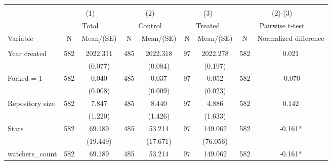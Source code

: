 
\begin{tabular}{@{\extracolsep{5pt}}lcccccccc}
\\[-1.8ex]\hline \hline \\[-1.8ex]
 & \multicolumn{2}{c}{(1)}  & \multicolumn{2}{c}{(2)}  & \multicolumn{2}{c}{(3)}  & \multicolumn{2}{c}{(2)-(3)} \\
 & \multicolumn{2}{c}{Total}  & \multicolumn{2}{c}{Control}  & \multicolumn{2}{c}{Treated}  & \multicolumn{2}{c}{Pairwise t-test}  \\
Variable & N & Mean/(SE) & N & Mean/(SE) & N & Mean/(SE) & N & Normalized difference \\ \hline \\[-1.8ex] 
Year created   & 582    & 2022.311    & 485    & 2022.318    & 97    & 2022.278    & 582    & 0.021   \\
 &   & (0.077)  &   & (0.084)  &   & (0.197)  &   &  \\ [1ex]
Forked = 1   & 582    & 0.040    & 485    & 0.037    & 97    & 0.052    & 582    & -0.070   \\
 &   & (0.008)  &   & (0.009)  &   & (0.023)  &   &  \\ [1ex]
Repository size   & 582    & 7.847    & 485    & 8.440    & 97    & 4.886    & 582    & 0.142   \\
 &   & (1.220)  &   & (1.426)  &   & (1.633)  &   &  \\ [1ex]
Stars   & 582    & 69.189    & 485    & 53.214    & 97    & 149.062    & 582    & -0.161*   \\
 &   & (19.449)  &   & (17.671)  &   & (76.056)  &   &  \\ [1ex]
watchers\_count   & 582    & 69.189    & 485    & 53.214    & 97    & 149.062    & 582    & -0.161*   \\

\end{tabular}
